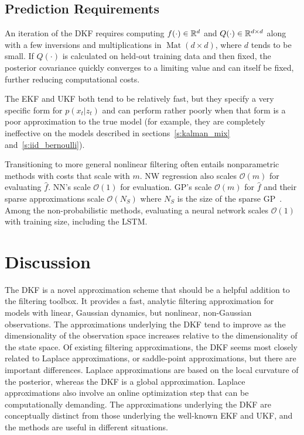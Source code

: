 \subsection{Prediction Requirements}  
An iteration of the DKF requires computing $f(\cdot)\in\mathbb{R}^d$ and $Q(\cdot)\in\mathbb{R}^{d\times d}$ along with a few inversions and multiplications in $\operatorname{Mat}(d\times d)$, where $d$ tends to be small.  If $Q(\cdot)$ is calculated on held-out training data and then fixed, the posterior covariance quickly converges to a limiting value and can itself be fixed, further reducing computational costs. 

The EKF and UKF both tend to be relatively fast, but they specify a very specific form for $p(x_t|z_t)$ and can perform rather poorly when that form is a poor approximation to the true model (for example, they are completely ineffective on the models described in sections~\ref{s:kalman_mix} and~\ref{s:iid_bernoulli}).

Transitioning to more general nonlinear filtering often entails nonparametric methods with costs that scale with $m$.  NW regression also scales $\mathcal{O}(m)$ for evaluating $\hat f$.  NN's scale $\mathcal{O}(1)$ for evaluation.  GP's scale $\mathcal{O}(m)$ for $\hat f$ and their sparse approximations scale $\mathcal{O}(N_S)$ where $N_S$ is the size of the sparse GP~\cite{Qui05}.  Among the non-probabilistic methods, evaluating a neural network scales $\mathcal{O}(1)$ with training size, including the LSTM.

\section{Discussion}

The DKF is a novel approximation scheme that should be a helpful addition to the filtering toolbox. It provides a fast, analytic filtering approximation for models with linear, Gaussian dynamics, but nonlinear, non-Gaussian observations. The approximations underlying the DKF tend to improve as the dimensionality of the observation space increases relative to the dimensionality of the state space. Of existing filtering approximations, the DKF seems most closely related to Laplace approximations, or saddle-point approximations, but there are important differences. Laplace approximations are based on the local curvature of the posterior, whereas the DKF is a global approximation. Laplace approximations also involve an online optimization step that can be computationally demanding. The approximations underlying the DKF are conceptually distinct from those underlying the well-known EKF and UKF, and the methods are useful in different situations.

